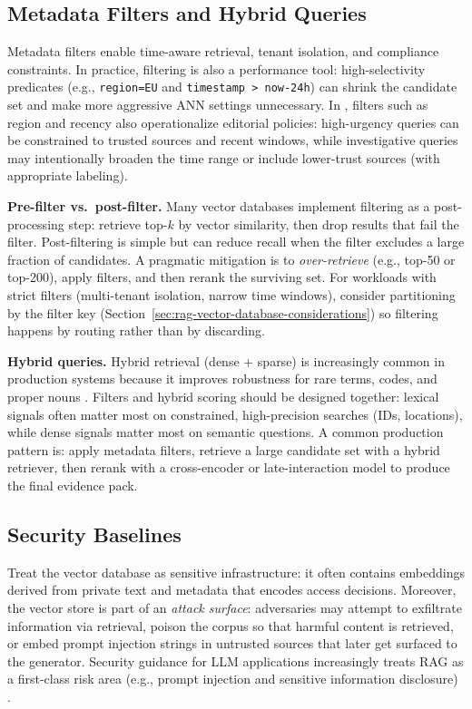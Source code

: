 \subsection{Metadata Filters and Hybrid Queries}
Metadata filters enable time-aware retrieval, tenant isolation, and compliance constraints. In practice, filtering is also a performance tool: high-selectivity predicates (e.g., \texttt{region=EU} and \texttt{timestamp > now-24h}) can shrink the candidate set and make more aggressive ANN settings unnecessary. In \ishtar{}, filters such as region and recency also operationalize editorial policies: high-urgency queries can be constrained to trusted sources and recent windows, while investigative queries may intentionally broaden the time range or include lower-trust sources (with appropriate labeling).

\textbf{Pre-filter vs.\ post-filter.} Many vector databases implement filtering as a post-processing step: retrieve top-$k$ by vector similarity, then drop results that fail the filter. Post-filtering is simple but can reduce recall when the filter excludes a large fraction of candidates. A pragmatic mitigation is to \emph{over-retrieve} (e.g., top-50 or top-200), apply filters, and then rerank the surviving set. For workloads with strict filters (multi-tenant isolation, narrow time windows), consider partitioning by the filter key (Section~\ref{sec:rag-vector-database-considerations}) so filtering happens by routing rather than by discarding.

\textbf{Hybrid queries.} Hybrid retrieval (dense + sparse) is increasingly common in production systems because it improves robustness for rare terms, codes, and proper nouns \cite{Lin2021SPLADE}. Filters and hybrid scoring should be designed together: lexical signals often matter most on constrained, high-precision searches (IDs, locations), while dense signals matter most on semantic questions. A common production pattern is: apply metadata filters, retrieve a large candidate set with a hybrid retriever, then rerank with a cross-encoder or late-interaction model to produce the final evidence pack.

\subsection{Security Baselines}
Treat the vector database as sensitive infrastructure: it often contains embeddings derived from private text and metadata that encodes access decisions. Moreover, the vector store is part of an \emph{attack surface}: adversaries may attempt to exfiltrate information via retrieval, poison the corpus so that harmful content is retrieved, or embed prompt injection strings in untrusted sources that later get surfaced to the generator. Security guidance for LLM applications increasingly treats RAG as a first-class risk area (e.g., prompt injection and sensitive information disclosure) \cite{OWASP2024LLMTop10}.

